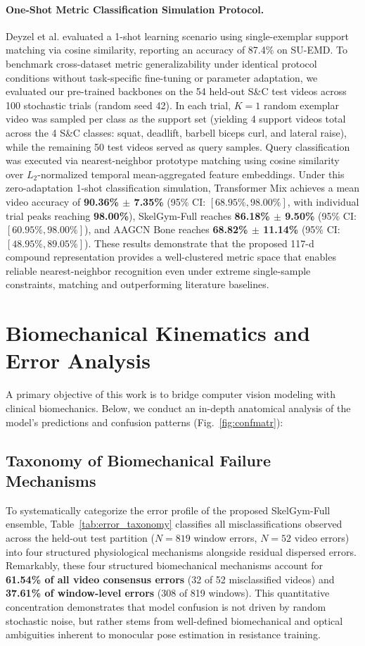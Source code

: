 \documentclass[preprint,12pt]{elsarticle}
\begin{document}
\paragraph{One-Shot Metric Classification Simulation Protocol.}
Deyzel et al. \cite{deyzel2023} evaluated a 1-shot learning scenario using single-exemplar support matching via cosine similarity, reporting an accuracy of 87.4\% on SU-EMD. To benchmark cross-dataset metric generalizability under identical protocol conditions without task-specific fine-tuning or parameter adaptation, we evaluated our pre-trained backbones on the 54 held-out S\&C test videos across 100 stochastic trials (random seed 42). In each trial, $K=1$ random exemplar video was sampled per class as the support set (yielding 4 support videos total across the 4 S\&C classes: squat, deadlift, barbell biceps curl, and lateral raise), while the remaining 50 test videos served as query samples. Query classification was executed via nearest-neighbor prototype matching using cosine similarity over $L_2$-normalized temporal mean-aggregated feature embeddings. Under this zero-adaptation 1-shot classification simulation, Transformer Mix achieves a mean video accuracy of \textbf{90.36\% $\pm$ 7.35\%} (95\% CI: $[68.95\%, 98.00\%]$, with individual trial peaks reaching \textbf{98.00\%}), SkelGym-Full reaches \textbf{86.18\% $\pm$ 9.50\%} (95\% CI: $[60.95\%, 98.00\%]$), and AAGCN Bone reaches \textbf{68.82\% $\pm$ 11.14\%} (95\% CI: $[48.95\%, 89.05\%]$). These results demonstrate that the proposed 117-d compound representation provides a well-clustered metric space that enables reliable nearest-neighbor recognition even under extreme single-sample constraints, matching and outperforming literature baselines.

\section{Biomechanical Kinematics and Error Analysis}
\label{sec:biomechanical_analysis}

A primary objective of this work is to bridge computer vision modeling with clinical biomechanics. Below, we conduct an in-depth anatomical analysis of the model's predictions and confusion patterns (Fig.~\ref{fig:confmatr}):

\subsection{Taxonomy of Biomechanical Failure Mechanisms}
To systematically categorize the error profile of the proposed SkelGym-Full ensemble, Table~\ref{tab:error_taxonomy} classifies all misclassifications observed across the held-out test partition ($N=819$ window errors, $N=52$ video errors) into four structured physiological mechanisms alongside residual dispersed errors. Remarkably, these four structured biomechanical mechanisms account for \textbf{61.54\% of all video consensus errors} (32 of 52 misclassified videos) and \textbf{37.61\% of window-level errors} (308 of 819 windows). This quantitative concentration demonstrates that model confusion is not driven by random stochastic noise, but rather stems from well-defined biomechanical and optical ambiguities inherent to monocular pose estimation in resistance training.
\end{document}
